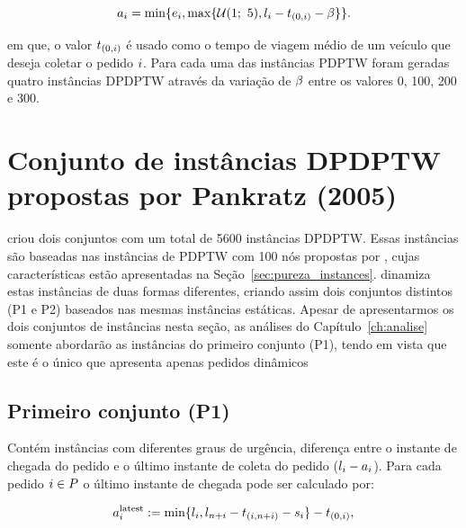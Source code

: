 \begin{equation}
    a_{i} = \min\{e_i,
    \max\{\mathcal{U}(1;\ 5), l_i -
    t_{(0,i)} - \beta\}\}.
  \label{eq:pureza_waiting_2008_requestArrivalTime}
\end{equation}


em que, o valor $t_{(0,i)}$ é usado como o tempo 
de viagem médio de um veículo que deseja coletar o pedido $i$.
Para cada uma das instâncias PDPTW foram geradas quatro instâncias DPDPTW 
através da variação de $\beta$ entre os valores 0, 100, 200 e 300.






\section{Conjunto de instâncias DPDPTW propostas por Pankratz (2005)}

\textcite{pankratz_dynamic_2005} criou dois conjuntos com um total de 5600 
instâncias DPDPTW.
Essas instâncias são baseadas nas instâncias de PDPTW com 100 nós propostas por
\textcite{li_metaheuristic_2003}, cujas características estão apresentadas 
na Seção~\ref{sec:pureza_instances}.
\textcite{pankratz_dynamic_2005} dinamiza estas instâncias de duas formas 
diferentes, criando assim dois conjuntos distintos (P1 e P2) baseados 
nas mesmas instâncias estáticas.
Apesar de apresentarmos os dois conjuntos de instâncias nesta seção, as 
análises do Capítulo~\ref{ch:analise} somente abordarão as instâncias do 
primeiro conjunto (P1), tendo em vista que este é o único que apresenta apenas
pedidos dinâmicos

\subsection{Primeiro conjunto (P1)}
Contém instâncias com diferentes graus de urgência, diferença entre o instante 
de chegada do pedido  e o último instante de coleta do
pedido ($l_i - a_i$). 
Para cada pedido $i \in P$ o último instante de chegada 
pode ser calculado por: 

\begin{equation}
  a{}_{i{}}^{\mathrm{latest}} := 
  \min\{l_i, l_{n + i} 
  - t_{(i,n + i)} 
  - s_i\} - t_{(0,i)},
  \label{eq:pankratz_dynamic_2005_requestLatestArrivalTime}
\end{equation}

